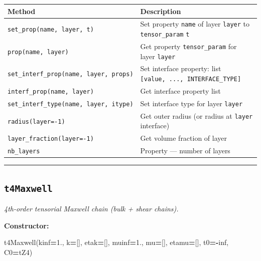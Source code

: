 \documentclass[
  a4paper,
  numbers=noendperiod,
  DIV=12]{scrreprt}
\newenvironment{Shaded}{\begin{snugshade}}{\end{snugshade}}
\newcommand{\FloatTok}[1]{\textcolor[rgb]{0.00,0.00,0.81}{#1}}
\newcommand{\NormalTok}[1]{#1}
\newcommand{\OperatorTok}[1]{\textcolor[rgb]{0.81,0.36,0.00}{\textbf{#1}}}
\newcounter{none} %
\begin{document}
{\def\LTcaptype{none} %
\begin{longtable}[]{@{}
  >{\raggedright\arraybackslash}p{}
  >{\raggedright\arraybackslash}p{}@{}}
\toprule\noalign{}
\begin{minipage}[b]{\linewidth}\raggedright
Method
\end{minipage} & \begin{minipage}[b]{\linewidth}\raggedright
Description
\end{minipage} \\
\midrule\noalign{}
\endhead
\bottomrule\noalign{}
\endlastfoot
\texttt{set\_prop(name,\ layer,\ t)} & Set property \texttt{name} of
layer \texttt{layer} to \texttt{tensor\_param} \texttt{t} \\
\texttt{prop(name,\ layer)} & Get property \texttt{tensor\_param} for
layer \texttt{layer} \\
\texttt{set\_interf\_prop(name,\ layer,\ props)} & Set interface
property: list \texttt{{[}value,\ ...,\ INTERFACE\_TYPE{]}} \\
\texttt{interf\_prop(name,\ layer)} & Get interface property list \\
\texttt{set\_interf\_type(name,\ layer,\ itype)} & Set interface type
for layer \texttt{layer} \\
\texttt{radius(layer=-1)} & Get outer radius (or radius at
\texttt{layer} interface) \\
\texttt{layer\_fraction(layer=-1)} & Get volume fraction of layer \\
\texttt{nb\_layers} & Property --- number of layers \\
\end{longtable}
}

\begin{center}\rule{0.5\linewidth}{0.5pt}\end{center}

\subsection{\texorpdfstring{\texttt{t4Maxwell}}{t4Maxwell}}\label{api-t4Maxwell}

\emph{4th-order tensorial Maxwell chain (bulk + shear chains).}

\textbf{Constructor:}

\begin{Shaded}
\begin{Highlighting}[]
\NormalTok{t4Maxwell(kinf}\OperatorTok{=}\FloatTok{1.}\NormalTok{, k}\OperatorTok{=}\NormalTok{[], etak}\OperatorTok{=}\NormalTok{[], muinf}\OperatorTok{=}\FloatTok{1.}\NormalTok{, mu}\OperatorTok{=}\NormalTok{[], etamu}\OperatorTok{=}\NormalTok{[],}
\NormalTok{          t0}\OperatorTok{={-}}\NormalTok{inf, C0}\OperatorTok{=}\NormalTok{tZ4)}
\end{Highlighting}
\end{Shaded}
\end{document}

